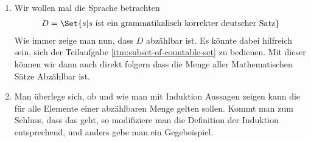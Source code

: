 \begin{exercise}
\begin{enumerate}[label=(\alph*)]
  \item Wir wollen mal die Sprache betrachten
    \begin{equation*}
      \begin{split}
        D = \Set{s | s \textnormal{ ist ein grammatikalisch korrekter deutscher Satz}}
      \end{split}
    \end{equation*}
    Wie immer zeige man nun, dass $D$ abzählbar ist. Es könnte dabei hilfreich
    sein, sich der Teilaufgabe \ref{itm:subset-of-countable-set} zu bedienen.
    Mit dieser können wir dann auch direkt folgern dass die Menge aller
    Mathematischen Sätze Abzählbar ist.

  \item Man überlege sich, ob und wie man mit Induktion Aussagen zeigen kann die
    für alle Elemente einer abzählbaren Menge gelten sollen. Kommt man zum
    Schluss, dass das geht, so modifiziere man die Definition der Induktion
    entsprechend, und anders gebe man ein Gegebeispiel.
  \end{enumerate}
\end{exercise}
